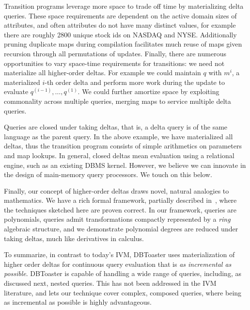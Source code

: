 Transition programs leverage more space to trade off time by materializing delta
queries. These space requirements are dependent on the active domain sizes of
attributes, and often attributes do not have many distinct values, for example
there are roughly 2800 unique stock ids on NASDAQ and NYSE. Additionally pruning
duplicate maps during compilation facilitates much reuse of maps given recursion
through all permutations of updates. Finally, there are numerous opportunities
to vary space-time requirements for transitions: we need not materialize all
higher-order deltas. For example we could maintain $q$ with $m^i$, a
materialized $i$-th order delta and perform more work during the update to
evaluate $q^{(i-1)}, \ldots, q^{(1)}$. We could further amortize space by
exploiting commonality across multiple queries, merging maps to service multiple
delta queries.



Queries are closed under taking deltas, that is, a delta query is of the same
language as the parent query. In the above example, we have materialized all
deltas, thus the transition program consists of simple arithmetics on parameters
and map lookups. In general, closed deltas mean evaluation using a relational
engine, such as an existing DBMS kernel. However, we believe we can innovate in
the design of main-memory query processors. We touch on this below.

Finally, our concept of higher-order deltas draws novel, natural analogies to
mathematics. We have a rich formal framework, partially described
in~\cite{koch-pods:10}, where the techniques sketched here are proven correct.
In our framework, queries are polynomials, queries admit transformations
compactly represented by a \textit{ring} algebraic structure, and we demonstrate
polynomial degrees are reduced under taking deltas, much like derivatives in
calculus.

To summarize, in contrast to today's IVM, DBToaster uses materialization of
higher order deltas for continuous query evaluation that is \textit{as
incremental as possible}. DBToaster is capable of handling a wide range of
queries, including, as discussed next, nested queries. This has not been
addressed in the IVM literature, and lets our technique cover complex, composed
queries, where being as incremental as possible is highly advantageous.

